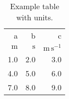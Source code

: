 \begin{table*}[htbp]
\caption{Example table with units.}
\begin{tabular}{rrr}
\hline\hline
a & b & c \\
$\mathrm{m}$ & $\mathrm{s}$ & $\mathrm{m\,s^{-1}}$ \\
\hline
1.0 & 2.0 & 3.0 \\
4.0 & 5.0 & 6.0 \\
7.0 & 8.0 & 9.0 \\
\end{tabular}
\end{table*}
